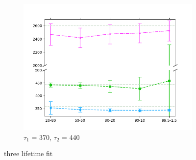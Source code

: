 \begin{figure}[p]
{        \begin{subfigure}{0.7\textwidth}
            \centering
            \includegraphics[width=0.95\linewidth]{Batch 7/348-440/output/3 life/lifetimes.png}
            \caption{$\tau_1$ = 370, $\tau_2$ = 440}
            \label{fig:3life_348}
        \end{subfigure}
    }
    \label{fig:3life}
    \caption{three lifetime fit} 
\end{figure}